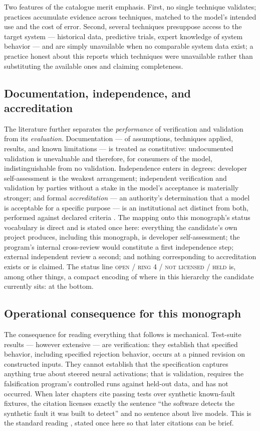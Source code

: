 Two features of the catalogue merit emphasis. First, no single technique validates; practices accumulate evidence across techniques, matched to the model's intended use and the cost of error. Second, several techniques presuppose access to the target system --- historical data, predictive trials, expert knowledge of system behavior --- and are simply unavailable when no comparable system data exist; a practice honest about this reports which techniques were unavailable rather than substituting the available ones and claiming completeness.

\subsection{Documentation, independence, and accreditation}\label{ch02:vv:independence}

The literature further separates the \emph{performance} of verification and validation from its \emph{evaluation}. Documentation --- of assumptions, techniques applied, results, and known limitations --- is treated as constitutive: undocumented validation is unevaluable and therefore, for consumers of the model, indistinguishable from no validation. Independence enters in degrees: developer self-assessment is the weakest arrangement; independent verification and validation by parties without a stake in the model's acceptance is materially stronger; and formal \emph{accreditation} --- an authority's determination that a model is acceptable for a specific purpose --- is an institutional act distinct from both, performed against declared criteria \cite{sargent}. The mapping onto this monograph's status vocabulary is direct and is stated once here: everything the candidate's own project produces, including this monograph, is developer self-assessment; the program's internal cross-review would constitute a first independence step; external independent review a second; and nothing corresponding to accreditation exists or is claimed. The status line \textsc{open / ring 4 / not licensed / held} is, among other things, a compact encoding of where in this hierarchy the candidate currently sits: at the bottom.

\subsection{Operational consequence for this monograph}\label{ch02:vv:consequence}

The consequence for reading everything that follows is mechanical. Test-suite results --- however extensive --- are verification: they establish that specified behavior, including specified rejection behavior, occurs at a pinned revision on constructed inputs. They cannot establish that the specification captures anything true about steered neural activations; that is validation, requires the falsification program's controlled runs against held-out data, and has not occurred. When later chapters cite passing tests over synthetic known-fault fixtures, the citation licenses exactly the sentence ``the software detects the synthetic fault it was built to detect'' and no sentence about live models. This is the standard reading \cite{sargent}, stated once here so that later citations can be brief.


